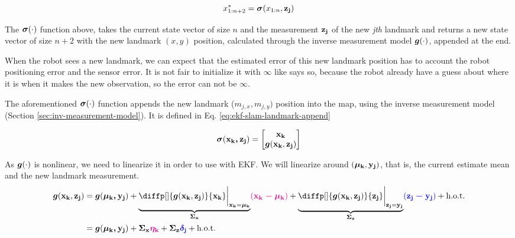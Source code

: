 \documentclass[12pt]{article}
\begin{document}
\begin{equation}
    x^*_{1:n+2} = {\boldsymbol{\sigma}}(x_{1:n}, \boldsymbol{\mathbf{z_j}})
\end{equation}

The ${\boldsymbol{\sigma}}(\cdot)$ function above, takes the current state vector of size 
$n$ and the measurement $\boldsymbol{\mathbf{z_j}}$ of the new \textit{jth} landmark and 
returns a new state vector of size $n+2$ with the new landmark $(x, y)$ 
position, calculated through the inverse measurement model ${\boldsymbol{g}}(\cdot)$, 
appended at the end.

When the robot sees a new landmark, we can expect that the estimated error of 
this new landmark position has to account the robot positioning error and the 
sensor error. It is not fair to initialize it with $\infty$ like 
\cite[p.~ 317]{bongard2006probabilistic} says so, because the robot already 
have a guess about where it is when it makes the new observation, so the error 
can not be $\infty$.

The aforementioned ${\boldsymbol{\sigma}}(\cdot)$ function appends the new landmark 
($m_{j,x}, m_{j,y})$ position into the map, using the inverse measurement model 
(Section \ref{sec:inv-measurement-model}). It is defined in Eq. 
\ref{eq:ekf-slam-landmark-append}

\begin{equation}
    {\boldsymbol{\sigma}}(\boldsymbol{\mathbf{x_k, z_j}}) = \begin{bmatrix}
        \boldsymbol{\mathbf{x_k}} \\
        {\boldsymbol{g}}(\boldsymbol{\mathbf{x_k}}, \boldsymbol{\mathbf{z_j}})
    \end{bmatrix}
    \label{eq:ekf-slam-landmark-append}
\end{equation}

As ${\boldsymbol{g}}(\cdot)$ is nonlinear, we need to linearize it in order to use with 
EKF. We will linearize around $(\boldsymbol{\mathbf{\mu_k}}, \boldsymbol{\mathbf{y_j}})$, that is, 
the current estimate mean and the new landmark measurement.
\begin{equation}
    \begin{aligned}
    \mb{g}(\bvec{x_k}, \bvec{z_j}) &= 
    \mb{g}(\bvec{\mu_k, y_j}) + \underbrace{\diffp[]{\mb{g}(\bvec{x_k}, \bvec{z_j})}{\bvec{x_k}} 
    \bigg\lvert_{\bvec{x_k} = \bvec{\mu_k}}}_{\mat{\Sigma_x}} 
    \magenta{(\bvec{x_k - \mu_k})} + \underbrace{\diffp[]{\mb{g}
    (\bvec{x_k}, \bvec{z_j})}{\bvec{z_j}} \bigg\lvert_{
        \bvec{z_j} = \bvec{y_j}}}_{\mat{\Sigma_z}} 
    \blue{(\bvec{z_j - y_j})} + \hot \\
    &= \mb{g}(\bvec{\mu_k, y_j}) + \mat{\Sigma_x} \magenta{\bvec{\eta_k}} 
    + \mat{\Sigma_z} \blue{\bvec{\delta_j}} + \hot
    \end{aligned}
\end{equation}
\end{document}
